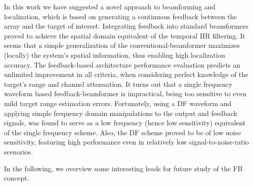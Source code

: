 In this work we have suggested a novel approach to beamforming and localization, which is based on generating a continuous feedback between the array and the target of interest.
Integrating feedback into standard beamformers proved to achieve the spatial domain equivalent of the temporal IIR filtering.
It seems that a simple generalization of the conventional-beamformer maximizes (locally) the system's spatial information, thus enabling high localization accuracy.
The feedback-based architecture performance evaluation predicts an unlimited improvement in all criteria, when considering perfect knowledge of the target's range and channel attenuation.
It turns out that a single frequency waveform based feedback-beamformer is impractical, being too sensitive to even mild target range estimation errors.
Fortunately, using a DF waveform and applying simple frequency domain manipulations to the output and feedback signals, was found to serve as a low frequency (hence low sensitivity) equivalent of the single frequency scheme.
Also, the DF scheme proved to be of low noise sensitivity, featuring high performance even in relatively low signal-to-noise-ratio scenarios.
\par In the following, we overview some interesting leads for future study of the FB concept.